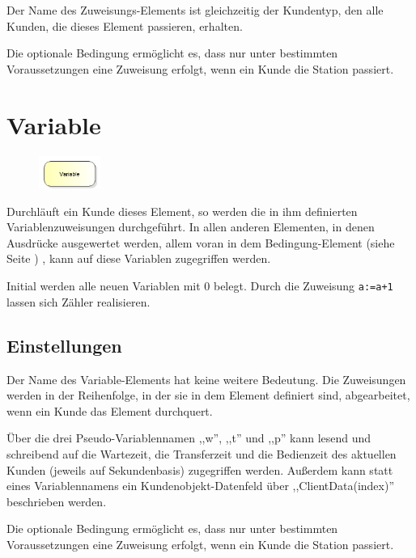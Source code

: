 Der Name des Zuweisungs-Elements ist gleichzeitig der Kundentyp, den alle Kunden, die dieses Element passieren, erhalten.

Die optionale Bedingung ermöglicht es, dass nur unter bestimmten Voraussetzungen eine Zuweisung erfolgt,
wenn ein Kunde die Station passiert.


\section{Variable}
\label{ref:ModelElementSet}

\begin{figure}
\vspace{-22pt}
\includegraphics[width=2cm]{imageModelElementSet.png}
\vspace{-22pt}
\end{figure}

Durchläuft ein Kunde dieses Element, so werden die in ihm definierten Variablenzuweisungen durchgeführt.
In allen anderen Elementen, in denen Ausdrücke ausgewertet werden, allem voran in dem
Bedingung-Element (siehe Seite \pageref{ref:ModelElementHold}) , kann auf diese Variablen zugegriffen werden.

Initial werden alle neuen Variablen mit 0 belegt. Durch die Zuweisung \texttt{a:=a+1} lassen sich
Zähler realisieren.

\subsection*{Einstellungen}

Der Name des Variable-Elements hat keine weitere Bedeutung. Die Zuweisungen werden in der Reihenfolge, in der
sie in dem Element definiert sind, abgearbeitet, wenn ein Kunde das Element durchquert.

Über die drei Pseudo-Variablennamen ,,w'', ,,t'' und ,,p'' kann lesend und schreibend auf die Wartezeit, die Transferzeit
und die Bedienzeit des aktuellen Kunden (jeweils auf Sekundenbasis) zugegriffen werden. Außerdem kann statt eines
Variablennamens ein Kundenobjekt-Datenfeld über ,,ClientData(index)'' beschrieben werden.

Die optionale Bedingung ermöglicht es, dass nur unter bestimmten Voraussetzungen eine Zuweisung erfolgt,
wenn ein Kunde die Station passiert.

